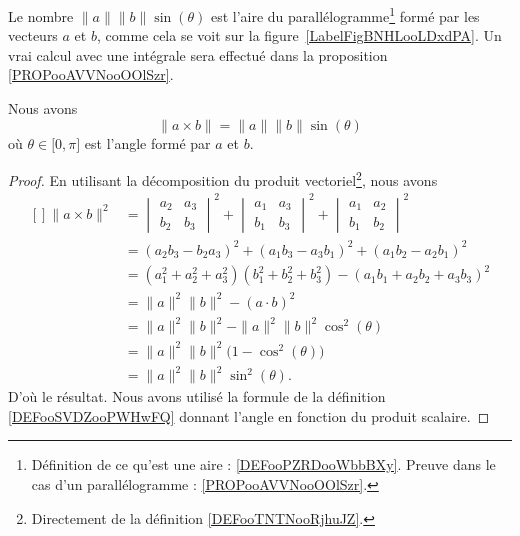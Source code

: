 \newcommand{\CaptionFigBNHLooLDxdPA}{Calculer l'aire d'un parallélogramme.}


\begin{remark}      \label{RemaAireParalProdVect}
	Le nombre $\| a \|\| b \|\sin(\theta)$ est l'aire du parallélogramme\footnote{Définition de ce qu'est une aire : \ref{DEFooPZRDooWbbBXy}. Preuve dans le cas d'un parallélogramme : \ref{PROPooAVVNooOOlSzr}.} formé par les vecteurs $a$ et $b$, comme cela se voit sur la figure~\ref{LabelFigBNHLooLDxdPA}. Un vrai calcul avec une intégrale sera effectué dans la proposition \ref{PROPooAVVNooOOlSzr}.
\end{remark}

\begin{proposition}     \label{PropNormeProdVectoabsint}
	Nous avons
	\begin{equation}
		\| a\times b \|=\| a \|\| b \|\sin(\theta)
	\end{equation}
	où $\theta\in\mathopen[ 0,\pi \mathclose]$ est l'angle formé par $a$ et $b$.
\end{proposition}

\begin{proof}
	En utilisant la décomposition du produit vectoriel\footnote{Directement de la définition \ref{DEFooTNTNooRjhuJZ}.}, nous avons
	\begin{equation}
		\begin{aligned}[]
			\| a\times b \|^2 & =\begin{vmatrix}
				a_2 & a_3 \\
				b_2 & b_3
			\end{vmatrix}^2+\begin{vmatrix}
				a_1 & a_3 \\
				b_1 & b_3
			\end{vmatrix}^2+\begin{vmatrix}
				a_1 & a_2 \\
				b_1 & b_2
			\end{vmatrix}^2 \\
			                  & =(a_2b_3-b_2a_3)^2+(a_1b_3-a_3b_1)^2+(a_1b_2-a_2b_1)^2                                  \\
			                  & =(a_1^2+a_2^2+a_3^2)(b_1^2+b_2^2+b_3^2)-(a_1b_1+a_2b_2+a_3b_3)^2                        \\
			                  & =\| a \|^2\| b \|^2-(a\cdot b)^2                                                        \\
			                  & =\| a \|^2\| b \|^2-\| a \|^2\| b \|^2\cos^2(\theta)                                    \\
			                  & =\| a \|^2\| b \|^2\big( 1-\cos^2(\theta) \big)                                         \\
			                  & =\| a \|^2\| b \|^2\sin^2(\theta).
		\end{aligned}
	\end{equation}
	D'où le résultat. Nous avons utilisé la formule de la définition \eqref{DEFooSVDZooPWHwFQ} donnant l'angle en fonction du produit scalaire.
\end{proof}

